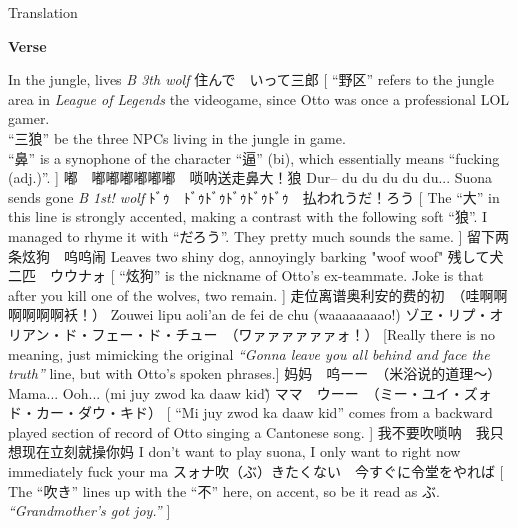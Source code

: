 \documentclass{ctexart}
\newenvironment{lverse}
	{
		\par
		\textbf{\LARGE Verse}
		\vspace{.5em}
		\par
	}
	{
		\par
	}
\begin{document}
\begin{section}{Translation}
\begin{lverse}
			{In the jungle, lives \textit{B 3th wolf}}
			{住んで　いって三郎}
			[
				“野区” refers to the jungle area in \textit{League of Legends} the videogame, since Otto was once a professional LOL gamer. \\
				“三狼” be the three NPCs living in the jungle in game. \\
				“鼻” is a synophone of the character “逼” (bi), which essentially means “fucking (adj.)”.
			]
		\lline
			{嘟　嘟嘟嘟嘟嘟嘟　唢呐送走鼻大！狼}
			{Dur-- du du du du du... Suona sends gone \textit{B 1st! wolf}}
			{ﾄﾞｩ　ﾄﾞｩﾄﾞｩﾄﾞｩﾄﾞｩﾄﾞｩ　払われうだ！ろう}
			[
				The “大” in this line is strongly accented, making a contrast with the following soft “狼”.
				I managed to rhyme it with “だろう”.
				They pretty much sounds the same.
			]
		\lline
			{留下两条炫狗　呜呜闹}
			{Leaves two shiny dog, annoyingly barking "woof woof"}
			{残して犬二匹　ウウナォ}
			[
				“炫狗” is the nickname of Otto's ex-teammate.
				Joke is that after you kill one of the wolves, two remain.
			]
		\lline
			{走位离谱奥利安的费的初　（哇啊啊啊啊啊啊袄！）}
			{Zouwei lipu aoli'an de fei de chu (waaaaaaaao!)}
			{ゾヱ・リプ・オリアン・ド・フェー・ド・チュー　（ワァァァァァァォ！）}
			[Really there is no meaning, just mimicking the original \textit{“Gonna leave you all behind and face the truth”} line, but with Otto's spoken phrases.]
		\lline
			{妈妈　呜ーー　（米浴说的道理～）}
			{Mama... Ooh... (mi juy zwod ka daaw kid\~)}
			{ママ　ウーー　（ミー・ユイ・ズォド・カー・ダウ・キド）}
			[
				“Mi juy zwod ka daaw kid” comes from a backward played section of record of Otto singing a Cantonese song.
			]
		\lline
			{我不要吹唢呐　我只想现在立刻就操你妈}
			{I don't want to play suona, I only want to right now immediately fuck your ma}
			{スォナ吹（ぶ）きたくない　今すぐに令堂をやれば}
			[
				The “吹き” lines up with the “不” here, on accent, so be it read as ぶ. \\
				\textit{“Grandmother's got joy.”}
			]
	\end{lverse}
\end{section}
\end{document}
